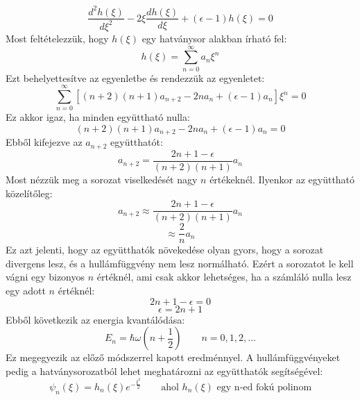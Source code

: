 \documentclass[a4paper,12pt]{article}
\begin{document}
\begin{equation}
    \frac{d^2 h(\xi)}{d \xi^2} - 2 \xi \frac{d h(\xi)}{d \xi} + (\epsilon - 1) h(\xi) = 0
\end{equation}
Most feltételezzük, hogy $h(\xi)$ egy hatványsor alakban írható fel:
\begin{equation}
    h(\xi) = \sum_{n=0}^{\infty} a_n \xi^n
\end{equation}
Ezt behelyettesítve az egyenletbe és rendezzük az egyenletet:
\begin{equation}
    \sum_{n=0}^{\infty} \left[ (n+2)(n+1) a_{n+2} - 2 n a_n + (\epsilon - 1) a_n \right] \xi^n = 0
\end{equation}
Ez akkor igaz, ha minden együttható nulla:
\begin{equation}
    (n+2)(n+1) a_{n+2} - 2 n a_n + (\epsilon - 1) a_n = 0
\end{equation}
Ebből kifejezve az $a_{n+2}$ együtthatót:
\begin{equation}
    a_{n+2} = \frac{2 n + 1 - \epsilon}{(n+2)(n+1)} a_n
\end{equation}
Most nézzük meg a sorozat viselkedését nagy $n$ értékeknél. Ilyenkor az együttható közelítőleg:
\begin{equation}
    a_{n+2} \approx \frac{2 n + 1 - \epsilon}{(n+2)(n+1)} a_n
\end{equation}
\begin{equation}
    \approx \frac{2}{n} a_n
\end{equation}
Ez azt jelenti, hogy az együtthatók növekedése olyan gyors, hogy a sorozat divergens lesz, és a hullámfüggvény nem lesz normálható. Ezért a sorozatot le kell vágni egy bizonyos $n$ értéknél, ami csak akkor lehetséges, ha a számláló nulla lesz egy adott $n$ értéknél:
\begin{equation}
    2 n + 1 - \epsilon = 0
\end{equation}
\begin{equation}
    \epsilon = 2 n + 1
\end{equation}
Ebből következik az energia kvantálódása:
\begin{equation}
    E_n = \hbar \omega \left( n + \frac{1}{2} \right) \quad \quad n = 0, 1, 2, \ldots
\end{equation}
Ez megegyezik az előző módszerrel kapott eredménnyel. A hullámfüggvényeket pedig a hatványsorozatból lehet meghatározni az együtthatók segítségével:
\begin{equation}
    \psi_n(\xi) = h_n(\xi) e^{- \frac{\xi^2}{2}} \quad \quad \text{ahol } h_n(\xi) \text{ egy n-ed fokú polinom}
\end{equation}
\end{document}
